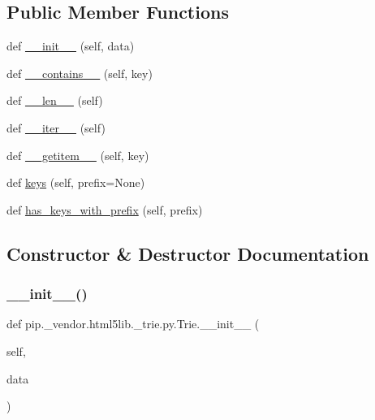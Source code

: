 \subsection*{Public Member Functions}
\begin{DoxyCompactItemize}
\item 
def \hyperlink{classpip_1_1__vendor_1_1html5lib_1_1__trie_1_1py_1_1Trie_afe66003840a960e0e20ed36f70ba311b}{\+\_\+\+\_\+init\+\_\+\+\_\+} (self, data)
\item 
def \hyperlink{classpip_1_1__vendor_1_1html5lib_1_1__trie_1_1py_1_1Trie_ad1859d39821a3f77fd81220a471e05f7}{\+\_\+\+\_\+contains\+\_\+\+\_\+} (self, key)
\item 
def \hyperlink{classpip_1_1__vendor_1_1html5lib_1_1__trie_1_1py_1_1Trie_a8f102a95599f78d27720b23090d9f51a}{\+\_\+\+\_\+len\+\_\+\+\_\+} (self)
\item 
def \hyperlink{classpip_1_1__vendor_1_1html5lib_1_1__trie_1_1py_1_1Trie_ab1508d7d51827361edc6bdad9a16ee77}{\+\_\+\+\_\+iter\+\_\+\+\_\+} (self)
\item 
def \hyperlink{classpip_1_1__vendor_1_1html5lib_1_1__trie_1_1py_1_1Trie_a6489add2ad97b05215128885ae43c54a}{\+\_\+\+\_\+getitem\+\_\+\+\_\+} (self, key)
\item 
def \hyperlink{classpip_1_1__vendor_1_1html5lib_1_1__trie_1_1py_1_1Trie_ad8be9b392bc45cfc72ca49ed1d52e127}{keys} (self, prefix=None)
\item 
def \hyperlink{classpip_1_1__vendor_1_1html5lib_1_1__trie_1_1py_1_1Trie_ac90aa181903278951be56c097398145d}{has\+\_\+keys\+\_\+with\+\_\+prefix} (self, prefix)
\end{DoxyCompactItemize}


\subsection{Constructor \& Destructor Documentation}
\mbox{\label{classpip_1_1__vendor_1_1html5lib_1_1__trie_1_1py_1_1Trie_afe66003840a960e0e20ed36f70ba311b}} 
\subsubsection{\texorpdfstring{\+\_\+\+\_\+init\+\_\+\+\_\+()}{\_\_init\_\_()}}
{\footnotesize\ttfamily def pip.\+\_\+vendor.\+html5lib.\+\_\+trie.\+py.\+Trie.\+\_\+\+\_\+init\+\_\+\+\_\+ (\begin{DoxyParamCaption}\item[{}]{self,  }\item[{}]{data }\end{DoxyParamCaption})}



